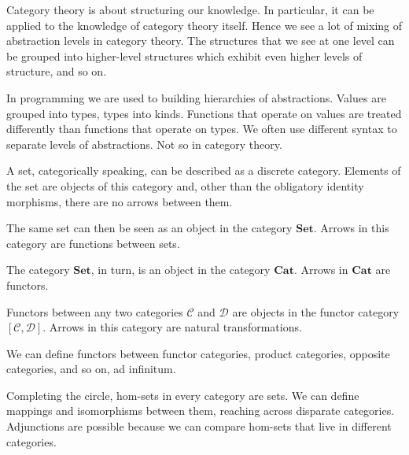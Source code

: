 \documentclass[DaoFP]{subfiles}
\begin{document}
Category theory is about structuring our knowledge. In particular, it can be applied to the knowledge of category theory itself. Hence we see a lot of mixing of abstraction levels in category theory. The structures that we see at one level can be grouped into higher-level structures which exhibit even higher levels of structure, and so on. 

In programming we are used to building hierarchies of abstractions. Values are grouped into types, types into kinds. Functions that operate on values are treated differently than functions that operate on types. We often use different syntax to separate levels of abstractions. Not so in category theory.

A set, categorically speaking, can be described as a discrete category. Elements of the set are objects of this category and, other than the obligatory identity morphisms, there are no arrows between them. 

The same set can then be seen as an object in the category $\mathbf{Set}$. Arrows in this category are functions between sets.

The category $\mathbf{Set}$, in turn, is an object in the category $\mathbf{Cat}$. Arrows in $\mathbf{Cat}$ are functors. 

Functors between any two categories $\mathcal{C}$ and $\mathcal{D}$ are objects in the functor category $[\mathcal{C}, \mathcal{D}]$. Arrows in this category are natural transformations.

We can define functors between functor categories, product categories, opposite categories, and so on, ad infinitum. 

Completing the circle, hom-sets in every category are sets. We can define mappings and isomorphisms between them, reaching across disparate categories. Adjunctions are possible because we can compare hom-sets that live in different categories.
\end{document}
